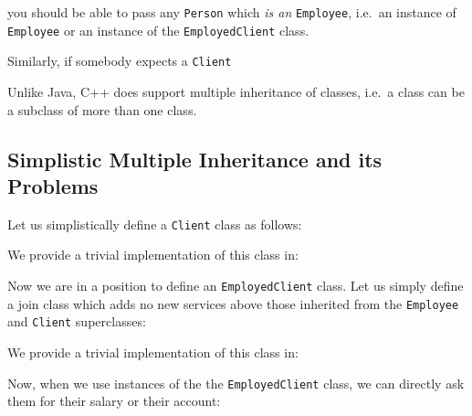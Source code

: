
\noindent
you should be able to pass any \verb+Person+ which {\em is an}
\verb+Employee+, i.e.\ an instance of \verb+Employee+ or an
instance of the \verb+EmployedClient+ class.

Similarly, if somebody expects a \verb+Client+



Unlike Java, C++ does support multiple inheritance 
of classes, i.e.\ a class can be a subclass of more than one class.


\subsection{Simplistic Multiple Inheritance and its Problems}

Let us simplistically define a \verb+Client+ class as follows:

\noindent {\small }

We provide a trivial implementation of this class in:

\noindent {\small }

Now we are in a position to define an \verb+EmployedClient+ class.
Let us simply define a join class which adds no new services above
those inherited from the \verb+Employee+ and \verb+Client+
superclasses:

\noindent {\small }

We provide a trivial implementation of this class in:

\noindent {\small }

Now, when we use instances of the the \verb+EmployedClient+ class, 
we can directly ask them for their salary or their account:

\noindent {\small }

